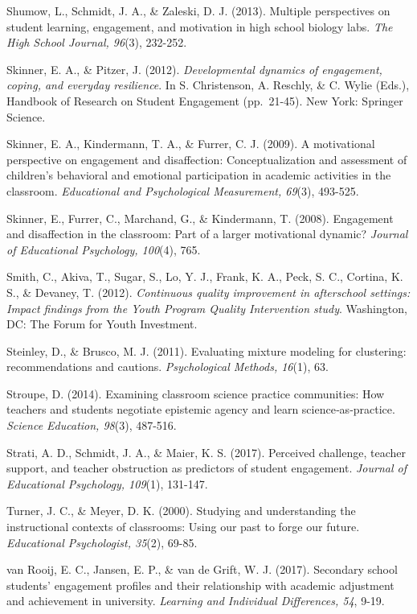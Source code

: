 \documentclass[]{book}
\theoremstyle{definition}
\theoremstyle{definition}
\theoremstyle{definition}
\theoremstyle{remark}
\begin{document}
Shumow, L., Schmidt, J. A., \& Zaleski, D. J. (2013). Multiple
perspectives on student learning, engagement, and motivation in high
school biology labs. \emph{The High School Journal, 96}(3), 232-252.

Skinner, E. A., \& Pitzer, J. (2012). \emph{Developmental dynamics of
engagement, coping, and everyday resilience}. In S. Christenson, A.
Reschly, \& C. Wylie (Eds.), Handbook of Research on Student Engagement
(pp.~21-45). New York: Springer Science.

Skinner, E. A., Kindermann, T. A., \& Furrer, C. J. (2009). A
motivational perspective on engagement and disaffection:
Conceptualization and assessment of children's behavioral and emotional
participation in academic activities in the classroom. \emph{Educational
and Psychological Measurement, 69}(3), 493-525.

Skinner, E., Furrer, C., Marchand, G., \& Kindermann, T. (2008).
Engagement and disaffection in the classroom: Part of a larger
motivational dynamic? \emph{Journal of Educational Psychology, 100}(4),
765.

Smith, C., Akiva, T., Sugar, S., Lo, Y. J., Frank, K. A., Peck, S. C.,
Cortina, K. S., \& Devaney, T. (2012). \emph{Continuous quality
improvement in afterschool settings: Impact findings from the Youth
Program Quality Intervention study}. Washington, DC: The Forum for Youth
Investment.

Steinley, D., \& Brusco, M. J. (2011). Evaluating mixture modeling for
clustering: recommendations and cautions. \emph{Psychological Methods,
16}(1), 63.

Stroupe, D. (2014). Examining classroom science practice communities:
How teachers and students negotiate epistemic agency and learn
science‐as‐practice. \emph{Science Education, 98}(3), 487-516.

Strati, A. D., Schmidt, J. A., \& Maier, K. S. (2017). Perceived
challenge, teacher support, and teacher obstruction as predictors of
student engagement. \emph{Journal of Educational Psychology, 109}(1),
131-147.

Turner, J. C., \& Meyer, D. K. (2000). Studying and understanding the
instructional contexts of classrooms: Using our past to forge our
future. \emph{Educational Psychologist, 35}(2), 69-85.

van Rooij, E. C., Jansen, E. P., \& van de Grift, W. J. (2017).
Secondary school students' engagement profiles and their relationship
with academic adjustment and achievement in university. \emph{Learning
and Individual Differences, 54}, 9-19.
\end{document}
